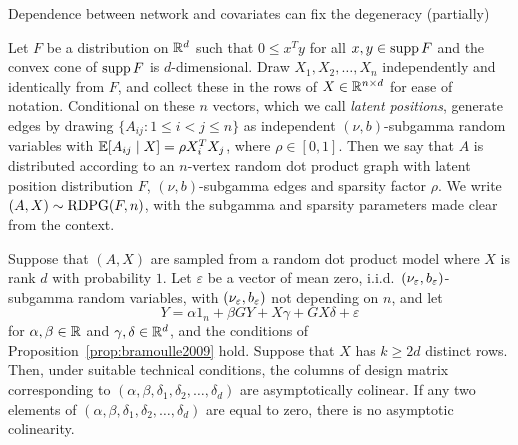 \documentclass[final]{beamer}
\newlength{\colwidth}
\begin{document}
\begin{frame}[t]
\begin{columns}[t]
\begin{column}{\colwidth}
\begin{block}{Dependence between network and covariates can fix the degeneracy (partially)}
                \begin{definition}
                    \label{def:rdpg}
                    Let $F$ be a distribution on $\mathbb{R}^d$ such that $0 \le x^T y$ for all $x,y \in \operatorname*{supp} F$ and the convex cone of $\operatorname*{supp} F$ is $d$-dimensional.
                    Draw $X_1, X_2, \dots, X_n$ independently and identically from $F$, and collect these in the rows of $X \in \mathbb{R}^{n \times d}$ for ease of notation.
                    Conditional on these $n$ vectors, which we call {\em latent positions}, generate edges by drawing $\{ A_{ij} : 1 \le i < j \le n \}$ as independent $(\nu,b)$-subgamma random variables with $\mathbb{E}[ A_{ij} \mid X ] = \rho X_i^T X_j$, where $\rho \in [0,1]$.
                    Then we say that $A$ is distributed according to an $n$-vertex random dot product graph with latent position distribution $F$, $(\nu,b)$-subgamma edges and sparsity factor $\rho$.
                    We write $(A,X) \sim \operatorname{RDPG}( F, n)$, with the subgamma and sparsity parameters made clear from the context.
                \end{definition}

                \begin{theorem} \label{thm:rdpg}
                    Suppose that $(A, X)$ are sampled from a random dot product model where $X$ is rank $d$ with probability $1$.
                    Let $\varepsilon$ be a vector of mean zero, i.i.d.~$(\nu_\varepsilon,b_\varepsilon)$-subgamma random variables, with $(\nu_\varepsilon,b_\varepsilon)$ not depending on $n$,
                    and let
                    \begin{equation*}
                        Y = \alpha 1_n + \beta G Y + X \gamma + G X \delta + \varepsilon
                    \end{equation*}
                    for $\alpha, \beta \in \mathbb{R}$ and $\gamma, \delta \in \mathbb{R}^d$, and the conditions of Proposition~\ref{prop:bramoulle2009} hold. Suppose that $X$ has $k \ge 2d$ distinct rows. Then, under suitable technical conditions, the columns of design matrix corresponding to $(\alpha, \beta, \delta_1, \delta_2, \dots, \delta_d)$ are asymptotically colinear. If any two elements of $(\alpha, \beta, \delta_1, \delta_2, \dots, \delta_d)$ are equal to zero, there is no asymptotic colinearity.
                \end{theorem}
            \end{block}


        \end{column}


\end{columns}
\end{frame}
\end{document}
